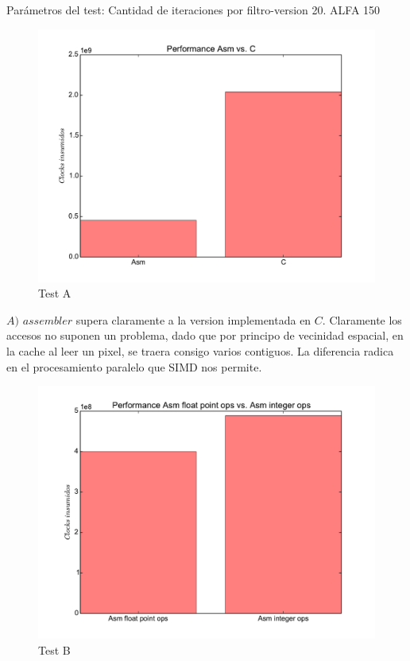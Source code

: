 
Parámetros del test: 
Cantidad de iteraciones por filtro-version 20.
ALFA 150

\begin{figure}[h]
  \begin{center}
	\includegraphics[scale=0.5]{ldrA.pdf}
	\caption{Test A}
  \end{center}
\end{figure}

$A)$ $assembler$ supera claramente a la version implementada en $C$. Claramente los accesos no suponen un problema, dado que por principo de vecinidad espacial, en la cache al leer un pixel, se traera consigo varios contiguos. La diferencia radica en el procesamiento paralelo que SIMD nos permite.

\begin{figure}[h]
  \begin{center}
	\includegraphics[scale=0.5]{ldrB.pdf}
	\caption{Test B}
  \end{center}
\end{figure}

